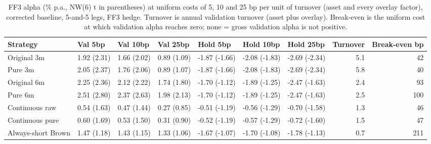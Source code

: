 \begin{table}[H]
\centering\small
\caption{FF3 alpha (\% p.a., NW(6) t in parentheses) at uniform costs of 5, 10 and 25 bp per unit of turnover (asset and every overlay factor), corrected baseline, 5-and-5 legs, FF3 hedge. Turnover is annual validation turnover (asset plus overlay). Break-even is the uniform cost at which validation alpha reaches zero; none = gross validation alpha is not positive.}
\label{tab:m2_costs_corr}
\begin{adjustbox}{max width=\linewidth}
\begin{tabular}{lllllllrr}
\toprule
Strategy & Val 5bp & Val 10bp & Val 25bp & Hold 5bp & Hold 10bp & Hold 25bp & Turnover & Break-even bp \\
\midrule
Original 3m & 1.92 (2.31) & 1.66 (2.02) & 0.89 (1.09) & -1.87 (-1.66) & -2.08 (-1.83) & -2.69 (-2.34) & 5.1 & 42 \\
Pure 3m & 2.05 (2.37) & 1.76 (2.06) & 0.89 (1.07) & -1.87 (-1.66) & -2.08 (-1.83) & -2.69 (-2.34) & 5.8 & 40 \\
Original 6m & 2.25 (2.36) & 2.12 (2.22) & 1.74 (1.80) & -1.70 (-1.12) & -1.89 (-1.25) & -2.47 (-1.63) & 2.4 & 93 \\
Pure 6m & 2.51 (2.80) & 2.37 (2.63) & 1.98 (2.13) & -1.70 (-1.12) & -1.89 (-1.25) & -2.47 (-1.63) & 2.5 & 100 \\
Continuous raw & 0.54 (1.63) & 0.47 (1.44) & 0.27 (0.85) & -0.51 (-1.19) & -0.56 (-1.29) & -0.70 (-1.58) & 1.3 & 46 \\
Continuous pure & 0.60 (1.69) & 0.53 (1.50) & 0.31 (0.90) & -0.52 (-1.19) & -0.57 (-1.29) & -0.72 (-1.60) & 1.5 & 47 \\
Always-short Brown & 1.47 (1.18) & 1.43 (1.15) & 1.33 (1.06) & -1.67 (-1.07) & -1.70 (-1.08) & -1.78 (-1.13) & 0.7 & 211 \\
\bottomrule
\end{tabular}
\end{adjustbox}
\end{table}
